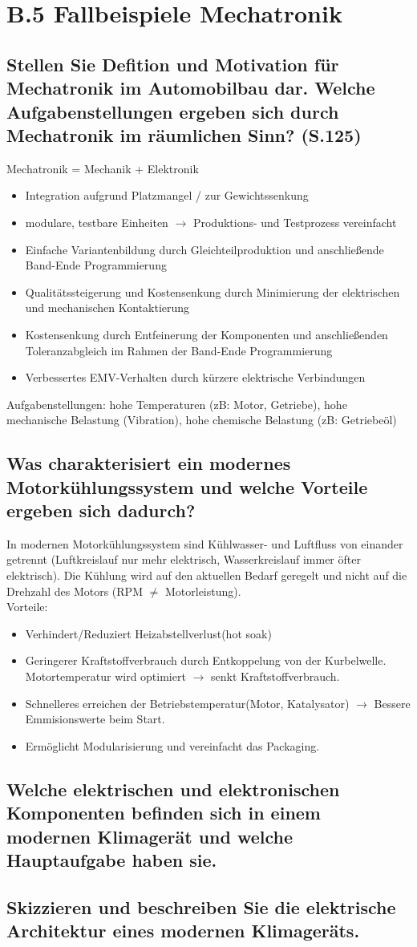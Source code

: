 \section*{B.5 Fallbeispiele Mechatronik}

\subsection{Stellen Sie Defition und Motivation f\"ur Mechatronik im Automobilbau dar. Welche Aufgabenstellungen ergeben sich durch Mechatronik im r\"aumlichen Sinn? (S.125)}
Mechatronik = Mechanik + Elektronik
\begin{itemize}
\item Integration aufgrund Platzmangel / zur Gewichtssenkung
\item modulare, testbare Einheiten $\rightarrow$ Produktions- und Testprozess vereinfacht
\item Einfache Variantenbildung durch Gleichteilproduktion und anschließende Band-Ende Programmierung
\item Qualitätssteigerung und Kostensenkung durch Minimierung der elektrischen und mechanischen Kontaktierung
\item Kostensenkung durch Entfeinerung der Komponenten und anschließenden Toleranzabgleich im Rahmen der 
Band-Ende Programmierung
\item Verbessertes EMV-Verhalten durch kürzere elektrische Verbindungen
\end{itemize}
Aufgabenstellungen: hohe Temperaturen (zB: Motor, Getriebe), hohe mechanische Belastung (Vibration), hohe 
chemische Belastung (zB: Getriebeöl)

\subsection{Was charakterisiert ein modernes Motorkühlungssystem und welche Vorteile ergeben sich dadurch?}
In modernen Motorkühlungssystem sind Kühlwasser- und Luftfluss von
einander getrennt (Luftkreislauf nur mehr elektrisch, Wasserkreislauf
immer öfter elektrisch). Die Kühlung wird auf den aktuellen Bedarf
geregelt und nicht auf die Drehzahl des Motors (RPM $\neq$ Motorleistung).\\
Vorteile:
\begin{itemize}
\item Verhindert/Reduziert Heizabstellverlust(hot soak)
\item Geringerer Kraftstoffverbrauch durch Entkoppelung von der
  Kurbelwelle. Motortemperatur wird optimiert $\rightarrow$ senkt Kraftstoffverbrauch.
\item Schnelleres erreichen der Betriebstemperatur(Motor, Katalysator)
  $\rightarrow$ Bessere Emmisionswerte beim Start.
\item Ermöglicht Modularisierung und vereinfacht das Packaging.
\end{itemize}

\subsection{Welche elektrischen und elektronischen Komponenten befinden sich in einem modernen Klimager\"at und welche Hauptaufgabe haben sie.}

\subsection{Skizzieren und beschreiben Sie die elektrische Architektur eines modernen Klimager\"ats.}
